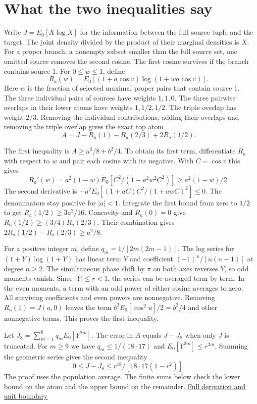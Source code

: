 \clearpage

\section{What the two inequalities say}\label{what-the-two-inequalities-say}

Write \(J=E_0[X\log X]\) for the information between the full source tuple and the target. The joint density divided by the product of their marginal densities is \(X\). For a proper branch, a nonempty subset smaller than the full source set, one omitted source removes the second cosine. The first cosine survives if the branch contains source 1. For \(0\le w\le1\), define \[
R_a(w)=E_0[(1+a\cos v)\log(1+wa\cos v)].
\] Here \(w\) is the fraction of selected maximal proper pairs that contain source 1. The three individual pairs of sources have weights \(1,1,0\). The three pairwise overlaps in their lower atoms have weights \(1,1/2,1/2\). The triple overlap has weight \(2/3\). Removing the individual contributions, adding their overlaps and removing the triple overlap gives the exact top atom \[
A=J-R_a(1)-R_a(2/3)+2R_a(1/2).
\]

The first inequality is \(A\ge a^2/8+b^2/4\). To obtain its first term, differentiate \(R_a\) with respect to \(w\) and pair each cosine with its negative. With \(C=\cos v\) this gives \[
R_a'(w)=a^2(1-w)E_0[C^2/(1-a^2w^2C^2)]\ge a^2(1-w)/2.
\] The second derivative is \(-a^2 E_0[(1+aC)C^2/(1+awC)^2]\le0\). The denominators stay positive for \(|a|<1\). Integrate the first bound from zero to \(1/2\) to get \(R_a(1/2)\ge3a^2/16\). Concavity and \(R_a(0)=0\) give \(R_a(1/2)\ge(3/4)R_a(2/3)\). Their combination gives \(2R_a(1/2)-R_a(2/3)\ge a^2/8\).

For a positive integer \(m\), define \(q_m=1/[2m(2m-1)]\). The log series for \((1+Y)\log(1+Y)\) has linear term \(Y\) and coefficient \((-1)^n/[n(n-1)]\) at degree \(n\ge2\). The simultaneous phase shift by \(\pi\) on both axes reverses \(Y\), so odd moments vanish. Since \(|Y|\le r<1\), the series can be averaged term by term. In the even moments, a term with an odd power of either cosine averages to zero. All surviving coefficients and even powers are nonnegative. Removing \(R_a(1)=J(a,0)\) leaves the term \(b^2 E_0[\cos^2 u]/2=b^2/4\) and other nonnegative terms. This proves the first inequality.

Let \(J_8=\sum_{m=1}^{8}q_m E_0[Y^{2m}]\). The error in \(A\) equals \(J-J_8\) when only \(J\) is truncated. For \(m\ge9\) we have \(q_m\le1/(18\cdot17)\) and \(E_0[Y^{2m}]\le r^{2m}\). Summing the geometric series gives the second inequality \[
0\le J-J_8\le r^{18}/[18\cdot17(1-r^2)].
\] The proof uses the population average. The finite sums below check the lower bound on the atom and the upper bound on the remainder. \href{https://github.com/sepahead/pid-rs/blob/main/audit/research/angular-unit-boundary/EXPOSITION.md}{Full derivation and unit boundary}

